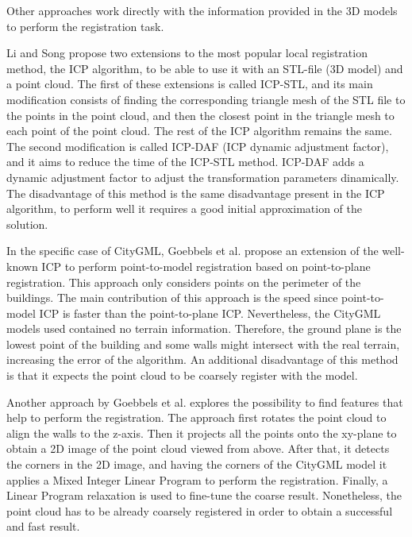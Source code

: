         Other approaches work directly with the information provided in the 3D models to perform the registration task.

        Li and Song \cite{Li_2015_amodified} propose two extensions to the most popular local registration method, the ICP algorithm, 
        to be able to use it with an STL-file (3D model) and a point cloud.
        The first of these extensions is called ICP-STL, and its main modification consists of finding the corresponding triangle mesh of the STL file to the points 
        in the point cloud, and then the closest point in the triangle mesh to each point of the point cloud. The rest of the ICP algorithm remains the same.
        The second modification is called ICP-DAF (ICP dynamic adjustment factor), and it aims to reduce the time of the ICP-STL method. 
        ICP-DAF adds a dynamic adjustment factor to adjust the transformation parameters dinamically.
        The disadvantage of this method is the same disadvantage present in the ICP algorithm, to perform well it requires a good initial approximation of the solution.

        In the specific case of CityGML, Goebbels et al. \cite{Goebbels_2019_icpcitygml} propose an extension of the well-known ICP
        to perform point-to-model registration based on point-to-plane registration.
        This approach only considers points on the perimeter of the buildings.
        The main contribution of this approach is the speed since point-to-model ICP is faster than the point-to-plane ICP.
        Nevertheless, the CityGML models used contained no terrain information. 
        Therefore, the ground plane is the lowest point of the building and some walls might intersect with the real terrain, increasing the error of the algorithm.
        An additional disadvantage of this method is that it expects the point cloud to be coarsely register with the model.

        Another approach by Goebbels et al. \cite{Goebbels_2018_alinear} explores the possibility to find features that help to perform the registration.
        The approach first rotates the point cloud to align the walls to the z-axis. Then it projects all the points onto the 
        xy-plane to obtain a 2D image of the point cloud viewed from above. After that, it detects the corners in the 2D image,
        and having the corners of the CityGML model it applies a Mixed Integer Linear Program to perform the registration.
        Finally, a Linear Program relaxation is used to fine-tune the coarse result. 
        Nonetheless, the point cloud has to be already coarsely registered in order to obtain a successful and fast result.

